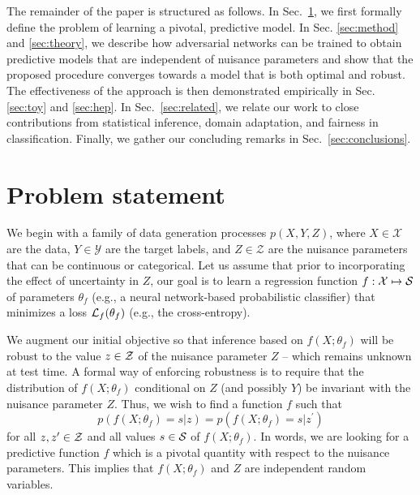 \documentclass{article}
\theoremstyle{plain}
\begin{document}
The remainder of the paper is structured as follows. In Sec.~\ref{sec:problem},
we first formally define the problem of learning a pivotal, predictive model. In
Sec. \ref{sec:method} and \ref{sec:theory}, we describe how adversarial
networks can be trained to obtain predictive models that are independent of
nuisance parameters and show that the proposed procedure converges
towards a model that is both optimal and robust. The  effectiveness of the
approach is then demonstrated empirically in Sec. \ref{sec:toy} and \ref{sec:hep}.
In Sec.~\ref{sec:related}, we relate our work to
close contributions from statistical inference, domain adaptation, and fairness
in classification. Finally, we gather our concluding remarks in
Sec.~\ref{sec:conclusions}.


\section{Problem statement}
\label{sec:problem}

We begin with a family of data generation processes $p(X,Y,Z)$, where $X \in
\mathcal{X}$ are the data, $Y\in \mathcal{Y}$ are the target labels, and $Z\in
\mathcal{Z}$ are the nuisance parameters that can be continuous or categorical.
Let us assume that prior to incorporating the effect of uncertainty
in $Z$, our goal is to learn a regression function $f : \mathcal{X} \mapsto
{\cal S}$ of parameters $\theta_f$ (e.g., a neural network-based probabilistic
classifier) that minimizes a loss ${\cal L}_f(\theta_f)$ (e.g., the
cross-entropy).

We augment our initial objective so that inference based on $f(X ; \theta_f)$ will be
robust to the value $z \in {\cal Z}$ of the nuisance parameter $Z$  -- which remains unknown at
test time. A formal way of enforcing robustness is to require that the distribution of
$f(X ; \theta_f)$ conditional on $Z$ (and possibly $Y$) be invariant with
 the nuisance parameter $Z$. Thus, we wish to find a function $f$ such that
\begin{equation}\label{eqn:criterion}
    p(f(X ; \theta_f) = s | z ) = p(f(X ; \theta_f) = s | z^\prime )
\end{equation}
for all $z,z^\prime \in  {\cal Z}$ and all values $s \in {\cal S}$ of $f(X ; \theta_f)$.
In words, we are looking for a predictive function $f$
which is a pivotal quantity \citep{degroot1986probability} with respect to the
nuisance parameters. This implies that  $f(X; \theta_f)$ and $Z$ are independent random variables.
\end{document}
